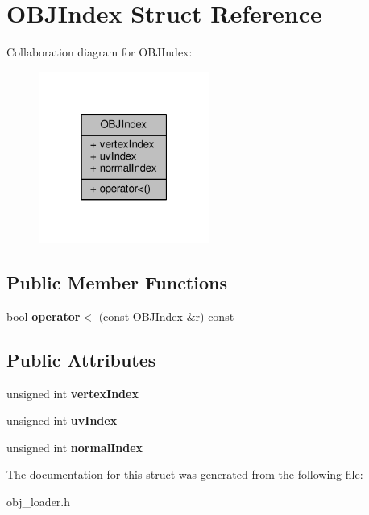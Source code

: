 \hypertarget{struct_o_b_j_index}{}\section{O\+B\+J\+Index Struct Reference}
\label{struct_o_b_j_index}


Collaboration diagram for O\+B\+J\+Index\+:\nopagebreak
\begin{figure}[H]
\begin{center}
\leavevmode
\includegraphics[width=159pt]{struct_o_b_j_index__coll__graph}
\end{center}
\end{figure}
\subsection*{Public Member Functions}
\begin{DoxyCompactItemize}
\item 
bool {\bfseries operator$<$} (const \hyperlink{struct_o_b_j_index}{O\+B\+J\+Index} \&r) const \hypertarget{struct_o_b_j_index_aa10893321f37dfaf5a7b71b8a9865542}{}\label{struct_o_b_j_index_aa10893321f37dfaf5a7b71b8a9865542}

\end{DoxyCompactItemize}
\subsection*{Public Attributes}
\begin{DoxyCompactItemize}
\item 
unsigned int {\bfseries vertex\+Index}\hypertarget{struct_o_b_j_index_acf4def56e1a20b00fa183e6a633c97a1}{}\label{struct_o_b_j_index_acf4def56e1a20b00fa183e6a633c97a1}

\item 
unsigned int {\bfseries uv\+Index}\hypertarget{struct_o_b_j_index_a2789d1a6ace791055e8627ad09d9c68c}{}\label{struct_o_b_j_index_a2789d1a6ace791055e8627ad09d9c68c}

\item 
unsigned int {\bfseries normal\+Index}\hypertarget{struct_o_b_j_index_a9af2bc243ac910fe1e6596aa85aa4ae6}{}\label{struct_o_b_j_index_a9af2bc243ac910fe1e6596aa85aa4ae6}

\end{DoxyCompactItemize}


The documentation for this struct was generated from the following file\+:\begin{DoxyCompactItemize}
\item 
obj\+\_\+loader.\+h\end{DoxyCompactItemize}
